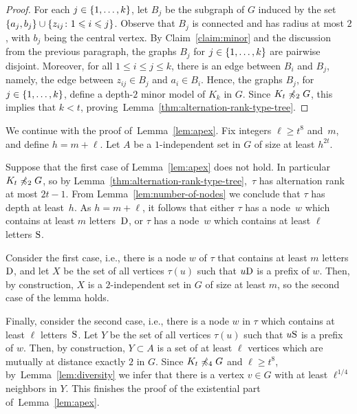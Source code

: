\begin{proof}
  For each $j\in\{1,\ldots,k\}$, let $B_j$ be the subgraph of $G$
  induced by the set
  $\{a_j,b_j\}\cup\{z_{ij}\colon 1\leqslant i\leqslant j\}$.  Observe that
  $B_j$ is connected and has radius at most $2$, with $b_j$ being the
  central vertex.  By Claim~\ref{claim:minor} and the discussion from
  the previous paragraph, the graphs $B_j$ for $j\in \{1,\ldots,k\}$
  are pairwise disjoint.  Moreover, for all $1\le i\le j\le k$, there
  is an edge between $B_i$ and $B_j$, namely, the edge between
  $z_{ij}\in B_j$ and $a_i\in B_i$.  Hence, the graphs $B_j$, for
  $j\in \{1,\ldots,k\}$, define a depth-$2$ minor model of $K_k$ in
  $G$. Since $K_t\not\preccurlyeq_{2}G$, this implies that $k<t$,
  proving~Lemma~\ref{thm:alternation-rank-type-tree}.
\end{proof}

We continue with the proof of~Lemma~\ref{lem:apex}.  Fix integers
$\ell\ge t^8$ and~$m$, and define $h=m+\ell$.  Let $A$ be a
$1$-independent set in $G$ of size at least $h^{2t}$.

Suppose that the first case of Lemma~\ref{lem:apex} does not hold. In
particular $K_t\not\preccurlyeq_2 G$, so by
Lemma~\ref{thm:alternation-rank-type-tree},~$\tau$ has alternation
rank at most $2t-1$. From Lemma~\ref{lem:number-of-nodes} we conclude
that $\tau$ has depth at least~$h$.  As $h=m+\ell$, it follows that
either $\tau$ has a node~$w$ which contains at least $m$
letters~$\mathrm{D}$, or $\tau$ has a node~$w$ which contains at least
$\ell$ letters $\mathrm{S}$.

Consider the first case, i.e., there is a node $w$ of $\tau$ that
contains at least $m$ letters $\mathrm{D}$, and let $X$ be the set of all
vertices $\tau(u)$ such that $u\mathrm{D}$ is a prefix of $w$. Then, by
construction, $X$ is a $2$-independent set in $G$ of size at least
$m$, so the second case of the lemma holds.

Finally, consider the second case, i.e., there is a node $w$ in $\tau$
which contains at least $\ell$ letters~$\mathrm{S}$. Let $Y$ be the set of
all vertices $\tau(u)$ such that $u\mathrm{S}$ is a prefix of $w$. Then, by
construction, $Y\subset A$ is a set of at least $\ell$ vertices which
are mutually at distance exactly $2$ in $G$.  Since
$K_t\not\preccurlyeq_4 G$ and $\ell\geq t^8$, by~Lemma~\ref{lem:diversity}
we infer that there is a vertex $v\in G$ with at least $\ell^{1/4}$
neighbors in $Y$.  This finishes the proof of the existential part
of~Lemma~\ref{lem:apex}.

